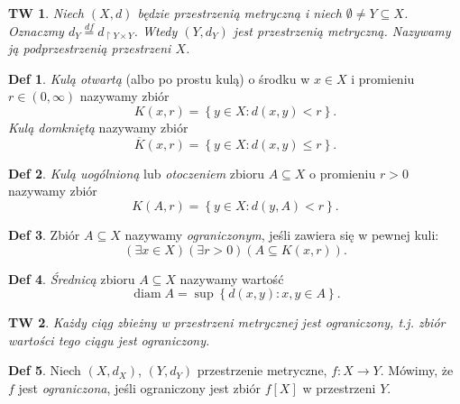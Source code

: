 \documentclass[a4paper, 12pt]{mwart}
\DeclareMathOperator{\diam}{diam}
\theoremstyle{definition}
\newtheorem{definicja}{Def}[section]
\theoremstyle{plain}
\newtheorem{twierdzenie}{TW}[section]
\theoremstyle{remark}
\begin{document}
\begin{twierdzenie}
	Niech $(X, d)$ będzie przestrzenią metryczną i niech $\emptyset \neq Y \subseteq X$. Oznaczmy $d_Y \overset{df}{=} d_{\restriction Y\times Y}$. Wtedy $(Y, d_Y)$ jest przestrzenią metryczną. Nazywamy ją \emph{podprzestrzenią przestrzeni $X$}.
\end{twierdzenie}
\begin{definicja}
	\emph{Kulą otwartą} (albo po prostu kulą) o środku w $x\in X$ i promieniu $r \in (0, \infty)$ nazywamy zbiór
	\begin{equation}
		K(x, r) = \left\{y \in X\colon d(x, y) < r\right\}.
	\end{equation}
	\emph{Kulą domkniętą} nazywamy zbiór
	\begin{equation}
		\overline K(x, r) = \left\{y\in X\colon d(x, y) \leq r\right\}.
	\end{equation}
\end{definicja}
\begin{definicja}
	\emph{Kulą uogólnioną} lub \emph{otoczeniem} zbioru $A \subseteq X$ o promieniu $r > 0$ nazywamy zbiór
	\begin{equation}
		K(A, r) = \left\{y \in X\colon d(y, A) < r\right\}.
	\end{equation}
\end{definicja}
\begin{definicja}
	Zbiór $A \subseteq X$ nazywamy \emph{ograniczonym}, jeśli zawiera się w pewnej kuli:
	\begin{equation}
		\left(\exists x \in X\right)\left(\exists r > 0\right)\left(A \subseteq K(x, r)\right).
	\end{equation}
\end{definicja}
\begin{definicja}
	\emph{Średnicą} zbioru $A \subseteq X$ nazywamy wartość
	\begin{equation}
		\diam A = \sup \left\{d(x, y)\colon x, y \in A \right\}.
	\end{equation}
\end{definicja}
\begin{twierdzenie}
	Każdy ciąg zbieżny w przestrzeni metrycznej jest ograniczony, t.j. zbiór wartości tego ciągu jest ograniczony.
\end{twierdzenie}
\begin{definicja}
	Niech $(X, d_X)$, $(Y, d_Y)$ \ppauza przestrzenie metryczne, $f\colon X \to Y$. Mówimy, że $f$ jest \emph{ograniczona}, jeśli ograniczony jest zbiór $f[X]$ w przestrzeni $Y$.
\end{definicja}
\end{document}
